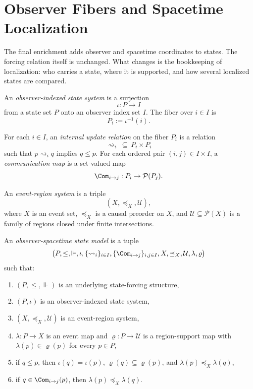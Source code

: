 \section{Observer Fibers and Spacetime Localization}\label{sec:observer-spacetime}

The final enrichment adds observer and spacetime coordinates to states. The forcing relation itself is unchanged. What changes is the bookkeeping of localization: who carries a state, where it is supported, and how several localized states are compared.

\begin{definition}\label{def:observer-indexed-state-system}
An \emph{observer-indexed state system} is a surjection
\[
\iota:P\to I
\]
from a state set $P$ onto an observer index set $I$. The fiber over $i\in I$ is
\[
P_i:=\iota^{-1}(i).
\]
\end{definition}

\begin{definition}\label{def:internal-updates-and-communication}
For each $i\in I$, an \emph{internal update relation} on the fiber $P_i$ is a relation
\[
\rightsquigarrow_i\ \subseteq\ P_i\times P_i
\]
such that $p\rightsquigarrow_i q$ implies $q\le p$. For each ordered pair $(i,j)\in I\times I$, a \emph{communication map} is a set-valued map
\[
\Com_{i\to j}:P_i\to\mathcal{P}(P_j).
\]
\end{definition}

\begin{definition}\label{def:event-region-system}
An \emph{event-region system} is a triple
\[
(X,\preceq_X,\mathcal{U}),
\]
where $X$ is an event set, $\preceq_X$ is a causal preorder on $X$, and $\mathcal{U}\subseteq\mathcal{P}(X)$ is a family of regions closed under finite intersections.
\end{definition}

\begin{definition}\label{def:observer-spacetime-model}
An \emph{observer-spacetime state model} is a tuple
\[
\bigl(P,\le,\Vdash,\iota,\{\rightsquigarrow_i\}_{i\in I},\{\Com_{i\to j}\}_{i,j\in I},X,\preceq_X,\mathcal{U},\lambda,\varrho\bigr)
\]
such that:
\begin{enumerate}[label=(\roman*),nosep]
\item $(P,\le,\Vdash)$ is an underlying state-forcing structure,
\item $(P,\iota)$ is an observer-indexed state system,
\item $(X,\preceq_X,\mathcal{U})$ is an event-region system,
\item $\lambda:P\to X$ is an event map and $\varrho:P\to\mathcal{U}$ is a region-support map with $\lambda(p)\in\varrho(p)$ for every $p\in P$,
\item if $q\le p$, then $\iota(q)=\iota(p)$, $\varrho(q)\subseteq\varrho(p)$, and $\lambda(p)\preceq_X\lambda(q)$,
\item if $q\in \Com_{i\to j}(p)$, then $\lambda(p)\preceq_X\lambda(q)$.
\end{enumerate}
\end{definition}

